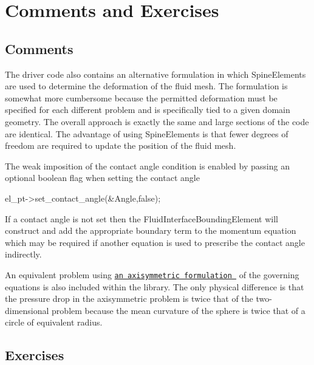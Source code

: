  

\hypertarget{index_comments}{}\section{Comments and Exercises}\label{index_comments}
\hypertarget{index_com}{}\subsection{Comments}\label{index_com}

\begin{DoxyItemize}
\item The driver code also contains an alternative formulation in which {\ttfamily Spine\+Elements} are used to determine the deformation of the fluid mesh. The formulation is somewhat more cumbersome because the permitted deformation must be specified for each different problem and is specifically tied to a given domain geometry. The overall approach is exactly the same and large sections of the code are identical. The advantage of using {\ttfamily Spine\+Elements} is that fewer degrees of freedom are required to update the position of the fluid mesh.
\item The weak imposition of the contact angle condition is enabled by passing an optional boolean flag when setting the contact angle 
\begin{DoxyCode}
el\_pt->set\_contact\_angle(&Angle,\textcolor{keyword}{false});
\end{DoxyCode}
 If a contact angle is not set then the {\ttfamily Fluid\+Interface\+Bounding\+Element} will construct and add the appropriate boundary term to the momentum equation which may be required if another equation is used to prescribe the contact angle indirectly.
\item An equivalent problem using \href{../../../axisym_navier_stokes/axi_static_cap/html/index.html}{\tt an axisymmetric formulation } of the governing equations is also included within the library. The only physical difference is that the pressure drop in the axisymmetric problem is twice that of the two-\/dimensional problem because the mean curvature of the sphere is twice that of a circle of equivalent radius.
\end{DoxyItemize}\hypertarget{index_exercises}{}\subsection{Exercises}\label{index_exercises}

